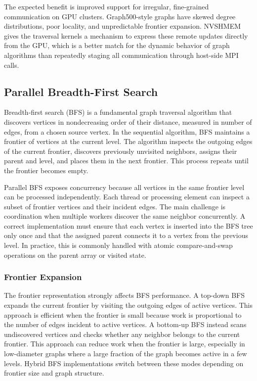 \documentclass{article}
\begin{document}
The expected benefit is improved support for irregular, fine-grained communication on GPU clusters. Graph500-style graphs have skewed degree distributions, poor locality, and unpredictable frontier expansion. NVSHMEM gives the traversal kernels a mechanism to express these remote updates directly from the GPU, which is a better match for the dynamic behavior of graph algorithms than repeatedly staging all communication through host-side MPI calls.

\subsection{Parallel Breadth-First Search}

Breadth-first search (BFS) is a fundamental graph traversal algorithm that discovers vertices in nondecreasing order of their distance, measured in number of edges, from a chosen source vertex. In the sequential algorithm, BFS maintains a frontier of vertices at the current level. The algorithm inspects the outgoing edges of the current frontier, discovers previously unvisited neighbors, assigns their parent and level, and places them in the next frontier. This process repeats until the frontier becomes empty.

Parallel BFS exposes concurrency because all vertices in the same frontier level can be processed independently. Each thread or processing element can inspect a subset of frontier vertices and their incident edges. The main challenge is coordination when multiple workers discover the same neighbor concurrently. A correct implementation must ensure that each vertex is inserted into the BFS tree only once and that the assigned parent connects it to a vertex from the previous level. In practice, this is commonly handled with atomic compare-and-swap operations on the parent array or visited state.

\subsubsection*{Frontier Expansion}

The frontier representation strongly affects BFS performance. A top-down BFS expands the current frontier by visiting the outgoing edges of active vertices. This approach is efficient when the frontier is small because work is proportional to the number of edges incident to active vertices. A bottom-up BFS instead scans undiscovered vertices and checks whether any neighbor belongs to the current frontier. This approach can reduce work when the frontier is large, especially in low-diameter graphs where a large fraction of the graph becomes active in a few levels. Hybrid BFS implementations switch between these modes depending on frontier size and graph structure.
\end{document}
